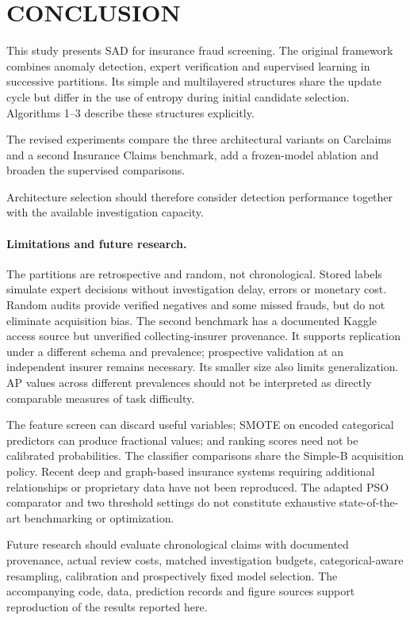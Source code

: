 \section{CONCLUSION}\label{SC:CONCLUSION}\label{sec:conclusion}
This study presents SAD for insurance fraud screening. The original
framework combines anomaly detection, expert verification and supervised
learning in successive partitions. Its simple and multilayered structures
share the update cycle but differ in the use of entropy during initial
candidate selection. Algorithms 1--3 describe these structures explicitly.

The revised experiments compare the three architectural variants on
Carclaims and a second Insurance Claims benchmark, add a frozen-model
ablation and broaden the supervised comparisons.

Architecture selection should therefore consider detection performance
together with the available investigation capacity.

\paragraph{Limitations and future research.}
The partitions are retrospective and random, not chronological. Stored
labels simulate expert decisions without investigation delay, errors or
monetary cost. Random audits provide verified negatives and some missed
frauds, but do not eliminate acquisition bias. The second benchmark has a
documented Kaggle access source but unverified collecting-insurer provenance.
It supports replication under a different schema and prevalence;
prospective validation at an independent insurer remains necessary.
Its smaller size also limits generalization. AP values across
different prevalences should not be interpreted as directly comparable
measures of task difficulty.

The feature screen can discard useful variables; SMOTE on encoded
categorical predictors can produce fractional values; and ranking scores
need not be calibrated probabilities. The classifier comparisons share
the Simple-B acquisition policy. Recent deep and graph-based insurance
systems requiring additional relationships or proprietary data have not
been reproduced. The adapted PSO comparator and two threshold settings do
not constitute exhaustive state-of-the-art benchmarking or optimization.

Future research should evaluate chronological claims with documented
provenance, actual review costs, matched investigation budgets,
categorical-aware resampling, calibration and prospectively fixed model
selection. The accompanying code, data, prediction records and figure
sources support reproduction of the results reported here.
